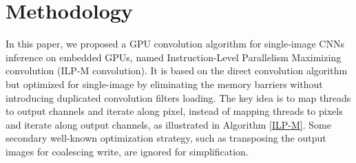 \documentclass{article}
\begin{document}
    
        
    
    




\section{Methodology} %


In this paper, we proposed a GPU convolution algorithm for single-image CNNs inference on embedded GPUs, named Instruction-Level Parallelism Maximizing convolution (ILP-M convolution). It is based on the direct convolution algorithm but optimized for single-image by eliminating the memory barriers without introducing duplicated convolution filters loading. The key idea is to map threads to output channels and iterate along pixel, instead of mapping threads to pixels and iterate along output channels, as illustrated in Algorithm \ref{ILP-M}. Some secondary well-known optimization strategy, such as transposing the output images for coalescing write, are ignored for simplification.

\end{document}
